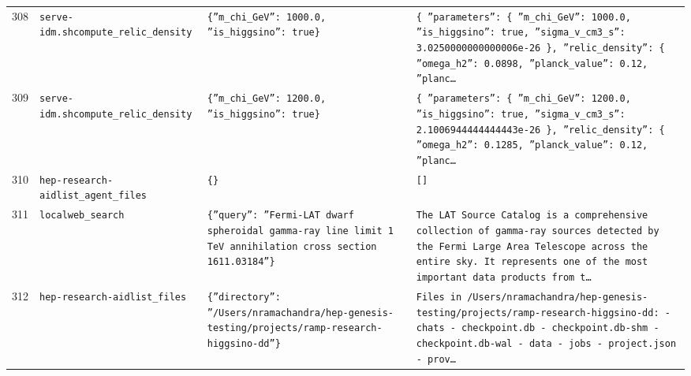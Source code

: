 \documentclass[11pt,a4paper]{article}
\begin{document}
\begin{longtable}{@{}p{}p{}p{}p{}@{}}
308 & \texttt{serve-idm.sh}\newline\texttt{compute\_\allowbreak{}relic\_\allowbreak{}density} & \texttt{\{''m\_\allowbreak{}chi\_\allowbreak{}GeV'':\allowbreak{} 1000.0,\allowbreak{} ''is\_\allowbreak{}higgsino'':\allowbreak{} true\}\allowbreak{}} & \texttt{\{   ''parameters'':\allowbreak{} \{     ''m\_\allowbreak{}chi\_\allowbreak{}GeV'':\allowbreak{} 1000.0,\allowbreak{}     ''is\_\allowbreak{}higgsino'':\allowbreak{} true,\allowbreak{}     ''sigma\_\allowbreak{}v\_\allowbreak{}cm3\_\allowbreak{}s'':\allowbreak{} 3.0250000000000006e-26   \}\allowbreak{},\allowbreak{}   ''relic\_\allowbreak{}density'':\allowbreak{} \{     ''omega\_\allowbreak{}h2'':\allowbreak{} 0.0898,\allowbreak{}     ''planck\_\allowbreak{}value'':\allowbreak{} 0.12,\allowbreak{}     ''planc\ldots{}\allowbreak{}} \\
309 & \texttt{serve-idm.sh}\newline\texttt{compute\_\allowbreak{}relic\_\allowbreak{}density} & \texttt{\{''m\_\allowbreak{}chi\_\allowbreak{}GeV'':\allowbreak{} 1200.0,\allowbreak{} ''is\_\allowbreak{}higgsino'':\allowbreak{} true\}\allowbreak{}} & \texttt{\{   ''parameters'':\allowbreak{} \{     ''m\_\allowbreak{}chi\_\allowbreak{}GeV'':\allowbreak{} 1200.0,\allowbreak{}     ''is\_\allowbreak{}higgsino'':\allowbreak{} true,\allowbreak{}     ''sigma\_\allowbreak{}v\_\allowbreak{}cm3\_\allowbreak{}s'':\allowbreak{} 2.1006944444444443e-26   \}\allowbreak{},\allowbreak{}   ''relic\_\allowbreak{}density'':\allowbreak{} \{     ''omega\_\allowbreak{}h2'':\allowbreak{} 0.1285,\allowbreak{}     ''planck\_\allowbreak{}value'':\allowbreak{} 0.12,\allowbreak{}     ''planc\ldots{}\allowbreak{}} \\
310 & \texttt{hep-research-aid}\newline\texttt{list\_\allowbreak{}agent\_\allowbreak{}files} & \texttt{\{\}\allowbreak{}} & \texttt{[]\allowbreak{}} \\
311 & \texttt{local}\newline\texttt{web\_\allowbreak{}search} & \texttt{\{''query'':\allowbreak{} ''Fermi-LAT dwarf spheroidal gamma-ray line limit 1 TeV annihilation cross section 1611.03184''\}\allowbreak{}} & \texttt{The LAT Source Catalog is a comprehensive collection of gamma-ray sources detected by the Fermi Large Area Telescope across the entire sky. It represents one of the most important data products from t\ldots{}\allowbreak{}} \\
312 & \texttt{hep-research-aid}\newline\texttt{list\_\allowbreak{}files} & \texttt{\{''directory'':\allowbreak{} ''/\allowbreak{}Users/\allowbreak{}nramachandra/\allowbreak{}hep-genesis-testing/\allowbreak{}projects/\allowbreak{}ramp-research-higgsino-dd''\}\allowbreak{}} & \texttt{Files in /\allowbreak{}Users/\allowbreak{}nramachandra/\allowbreak{}hep-genesis-testing/\allowbreak{}projects/\allowbreak{}ramp-research-higgsino-dd:\allowbreak{}   - chats   - checkpoint.db   - checkpoint.db-shm   - checkpoint.db-wal   - data   - jobs   - project.json   - prov\ldots{}\allowbreak{}} \\

\end{longtable}
\end{document}
